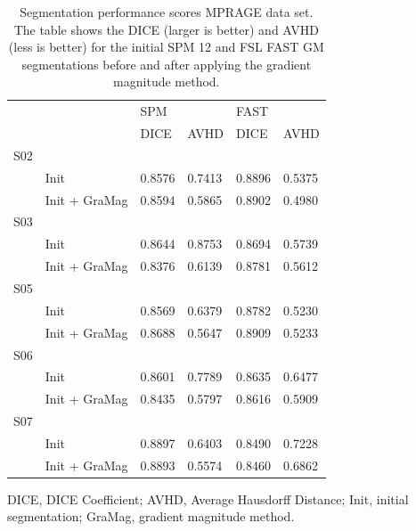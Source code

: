 \begin{table}[!ht]
\centering
\caption{
Segmentation performance scores MPRAGE data set. The table shows the DICE (larger is better) and AVHD (less is better) for the initial SPM 12 and FSL FAST GM segmentations before and after applying the gradient magnitude method.}
\begin{tabular}{llllll}
\hline
     &                & \vline SPM   &      & \vline FAST   &      \\
     &                & \vline DICE  & AVHD & \vline DICE       & AVHD \\
\hline
 S02 &                &            &            &             &             \\
     & Init           & 0.8576     & 0.7413     & 0.8896      & 0.5375      \\
     & Init + GraMag  & 0.8594     & 0.5865     & 0.8902      & 0.4980      \\
 S03 &                &            &            &             &             \\
     & Init           & 0.8644     & 0.8753     & 0.8694      & 0.5739      \\
     & Init + GraMag  & 0.8376     & 0.6139     & 0.8781      & 0.5612      \\
 S05 &                &            &            &             &             \\
     & Init           & 0.8569     & 0.6379     & 0.8782      & 0.5230      \\
     & Init + GraMag  & 0.8688     & 0.5647     & 0.8909      & 0.5233      \\
 S06 &                &            &            &             &             \\
     & Init           & 0.8601     & 0.7789     & 0.8635      & 0.6477      \\
     & Init + GraMag  & 0.8435     & 0.5797     & 0.8616      & 0.5909      \\
 S07 &                &            &            &             &             \\
     & Init           & 0.8897     & 0.6403     & 0.8490      & 0.7228      \\
     & Init + GraMag  & 0.8893     & 0.5574     & 0.8460      & 0.6862      \\
\hline
\end{tabular}
\begin{flushleft}
DICE, DICE Coefficient; AVHD, Average Hausdorff Distance; Init, initial segmentation; GraMag, gradient magnitude method.\\
\end{flushleft}
\label{table1}
\end{table}

